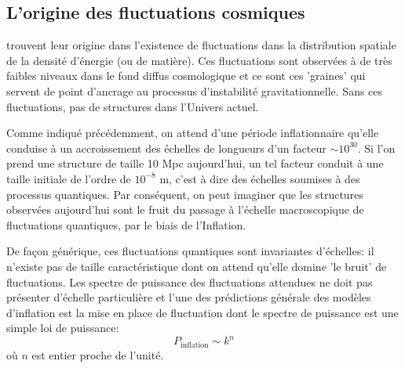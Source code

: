 \subsection{L'origine des fluctuations cosmiques}
 trouvent leur origine dans l'existence de fluctuations dans la distribution spatiale de la densité d'énergie (ou de matière). Ces fluctuations sont observées à de très faibles niveaux dans le fond diffus cosmologique et ce sont ces 'graines' qui servent de point d'ancrage au processus d'instabilité gravitationnelle. Sans ces fluctuations, pas de structures dans l'Univers actuel. 

Comme indiqué précédemment, on attend d'une période inflationnaire qu'elle conduise à un accroissement des échelles de longueurs d'un facteur $\sim 10^{30}$. Si l'on prend une structure de taille 10 Mpc aujourd'hui, un tel facteur conduit à  une taille initiale de l'ordre de $10^{-8}$ m, c'est à dire des échelles soumises à des processus quantiques. Par conséquent, on peut imaginer que les structures observées aujourd'hui sont le fruit du passage à l'échelle macroscopique de fluctuations quantiques, par le biais de l'Inflation. 

De façon générique, ces fluctuations quantiques sont invariantes d'échelles: il n'existe pas de taille caractéristique dont on attend qu'elle domine 'le bruit' de fluctuations. Les spectre de puissance des fluctuations attendues ne doit pas présenter d'échelle particulière et l'une des prédictions générale des modèles d'inflation est la mise en place de fluctuation dont le spectre de puissance est une simple loi de puissance:
\begin{equation}
P_\mathrm{inflation}\sim k^n
\end{equation}
où $n$ est entier proche de l'unité.


